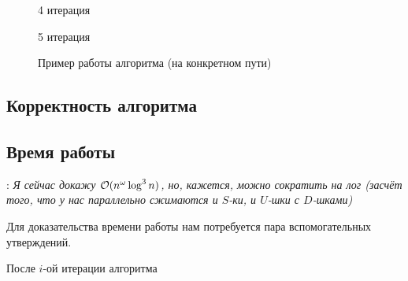 \begin{figure}[H]
\begin{minipage}[h]{0.47\linewidth}
    \end{minipage}
    \vfill
    \begin{minipage}[h]{0.47\linewidth}
         4 итерация
    \end{minipage}
    \hfill
    \begin{minipage}[h]{0.47\linewidth}
         5 итерация
    \end{minipage}

    \caption{Пример работы алгоритма (на конкретном пути)}
    \label{img:dyck1_example}
\end{figure}

\subsection{Корректность алгоритма}

\TODO

\subsection{Время работы}

\TODO: \textit{Я сейчас докажу $\mathcal{O}(n^{\omega} \log^3 n)$, но, кажется, можно сократить на лог (засчёт того, что у нас параллельно сжимаются и $S$-ки, и $U$-шки с $D$-шками)}

Для доказательства времени работы нам потребуется пара вспомогательных утверждений.

\begin{lemma}
    После $i$-ой итерации алгоритма 
\end{lemma}

